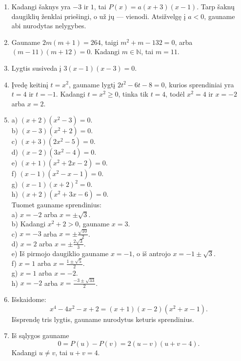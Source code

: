 \documentclass[11pt,a4paper]{scrartcl}
\begin{document}
\begin{enumerate}
    nelygybes.
    \item Kadangi šaknys yra $-3$ ir $1$, tai
    $P(x)=a(x+3)(x-1)$. Tarp šaknų daugiklių ženklai priešingi,
    o už jų — vienodi. Atsižvelgę į $a<0$, gauname abi nurodytas
    nelygybes.
    \item Gauname $2m(m+1)=264$, taigi
    $m^2+m-132=0$, arba $(m-11)(m+12)=0$.
    Kadangi $m\in\mathbb N$, tai $m=11$.
    \item Lygtis susiveda į $3(x-1)(x-3)=0$.
    \item Įvedę keitinį $t=x^2$, gauname lygtį
    $2t^2-6t-8=0$, kurios sprendiniai yra $t=4$ ir $t=-1$.
    Kadangi $t=x^2\ge0$, tinka tik $t=4$, todėl $x^2=4$ ir
    $x=-2$ arba $x=2$.
    \item a) $(x+2)(x^2-3)=0$. \\
    b) $(x-3)(x^2+2)=0$.\\
    c) $(x+3)(2x^2-5)=0$. \\
    d) $(x-2)(3x^2-4)=0$.\\
    e) $(x+1)(x^2+2x-2)=0$.\\
    f) $(x-1)(x^2-x-1)=0$. \\
    g) $(x-1)(x+2)^2=0$. \\
    h) $(x+2)(x^2+3x-6)=0$.\\
    Tuomet gauname sprendinius:\\
    a) $x=-2$ arba $x=\pm\sqrt3$. \\
    b) Kadangi $x^2+2>0$, gauname $x=3$. \\
    c) $x=-3$ arba $x=\pm\frac{\sqrt{10}}2$. \\
    d) $x=2$ arba $x=\pm\frac{2\sqrt3}{3}$. \\
    e) Iš pirmojo daugiklio gauname $x=-1$, o iš antrojo
    $x=-1\pm\sqrt3$. \\
    f) $x=1$ arba $x=\frac{1\pm\sqrt5}{2}$. \\
    g) $x=1$ arba $x=-2$. \\
    h) $x=-2$ arba $x=\frac{-3\pm\sqrt{33}}2$. \\
    \item Išskaidome:
    \[
    x^4-4x^2-x+2=(x+1)(x-2)(x^2+x-1).
    \]
    Išsprendę tris lygtis, gauname nurodytus keturis sprendinius.
    \item Iš sąlygos gauname
    \[
    0=P(u)-P(v)=2(u-v)(u+v-4).
    \]
    Kadangi $u\ne v$, tai $u+v=4$.
\end{enumerate}
\end{document}
